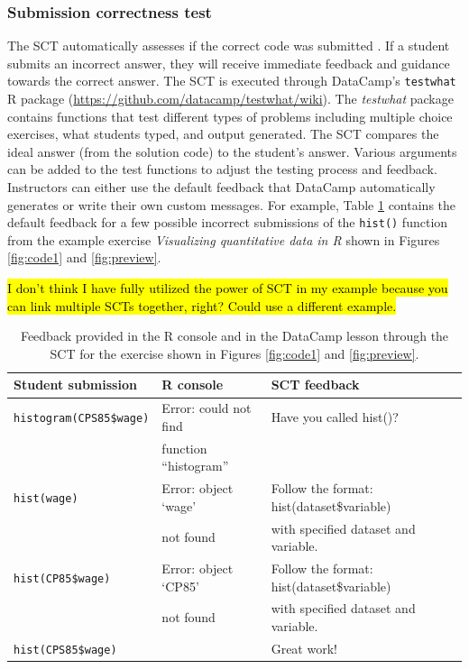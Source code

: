 \documentclass{tise_style_doi}
\begin{document}
\subsubsection{Submission correctness test}

The SCT automatically assesses if the correct code was submitted \citep{Vankrunkelsven2016}.
If a student submits an incorrect answer, they will receive immediate feedback and guidance towards
the correct answer.  The SCT is executed through DataCamp's \texttt{testwhat} R
package (\url{https://github.com/datacamp/testwhat/wiki}). The \textit{testwhat} package
contains functions that test different types of problems including multiple choice
exercises, what students typed, and output generated.  The SCT compares the ideal answer
(from the solution code) to the student's answer. Various arguments can be added to the
test functions to adjust the testing process and feedback.  Instructors can either use the
default feedback that DataCamp automatically generates or write their own custom messages.
For example, Table \ref{tab:SCT} contains the default feedback for a few possible incorrect submissions
of the \texttt{hist()} function from the example
exercise \textit{Visualizing quantitative data in R} shown in Figures \ref{fig:code1} and
\ref{fig:preview}.

\hl{I don't think I have fully utilized the power of SCT in my example because
you can link multiple SCTs together, right?  Could use a different example.}

\begin{table}
\begin{tabular}{lll}
\toprule
Student submission & R console & SCT feedback \\
\midrule
\texttt{histogram(CPS85\$wage)} & Error: could not find & Have you called hist()? \\
                                & function ``histogram'' & \\
[2ex]
\texttt{hist(wage)} & Error: object `wage' & Follow the format: hist(dataset\$variable) \\
                    &  not found           & with specified dataset and variable.\\
[2ex]
\texttt{hist(CP85\$wage)} & Error: object `CP85' & Follow the format: hist(dataset\$variable) \\
                               & not found       & with specified dataset and variable. \\
[2ex]
\texttt{hist(CPS85\$wage)} & & Great work! \\
\bottomrule
\end{tabular}
\caption{Feedback provided in the R console and in the DataCamp lesson through the
SCT for the exercise shown in Figures \ref{fig:code1} and \ref{fig:preview}.}
\label{tab:SCT}
\end{table}
\end{document}
